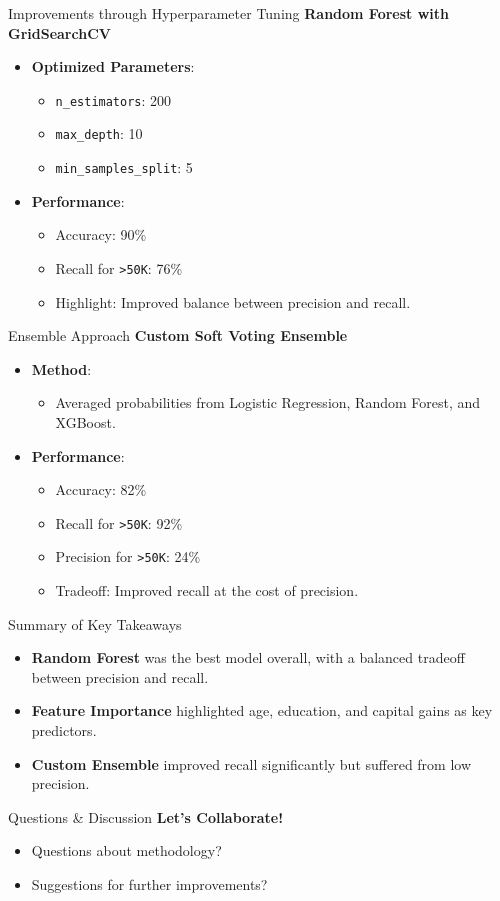 \documentclass{beamer}
\begin{document}
\begin{frame}{Improvements through Hyperparameter Tuning}
	\textbf{Random Forest with GridSearchCV}
	\begin{itemize}
		\item \textbf{Optimized Parameters}:
			\begin{itemize}
				\item \texttt{n\_estimators}: 200
				\item \texttt{max\_depth}: 10
				\item \texttt{min\_samples\_split}: 5
			\end{itemize}
		\item \textbf{Performance}:
			\begin{itemize}
				\item Accuracy: 90\%
				\item Recall for \texttt{>50K}: 76\%
				\item Highlight: Improved balance between precision and recall.
			\end{itemize}
	\end{itemize}
\end{frame}

\begin{frame}{Ensemble Approach}
	\textbf{Custom Soft Voting Ensemble}
	\begin{itemize}
		\item \textbf{Method}:
			\begin{itemize}
				\item Averaged probabilities from Logistic Regression, Random Forest, and XGBoost.
			\end{itemize}
		\item \textbf{Performance}:
			\begin{itemize}
				\item Accuracy: 82\%
				\item Recall for \texttt{>50K}: 92\%
				\item Precision for \texttt{>50K}: 24\%
				\item Tradeoff: Improved recall at the cost of precision.
			\end{itemize}
	\end{itemize}
\end{frame}

\begin{frame}{Summary of Key Takeaways}
	\begin{itemize}
		\item \textbf{Random Forest} was the best model overall, with a balanced tradeoff between precision and recall.
		\item \textbf{Feature Importance} highlighted age, education, and capital gains as key predictors.
		\item \textbf{Custom Ensemble} improved recall significantly but suffered from low precision.
	\end{itemize}
\end{frame}

\begin{frame}{Questions & Discussion}
	\textbf{Let's Collaborate!}
	\begin{itemize}
		\item Questions about methodology?
		\item Suggestions for further improvements?
	\end{itemize}
\end{frame}
\end{document}
